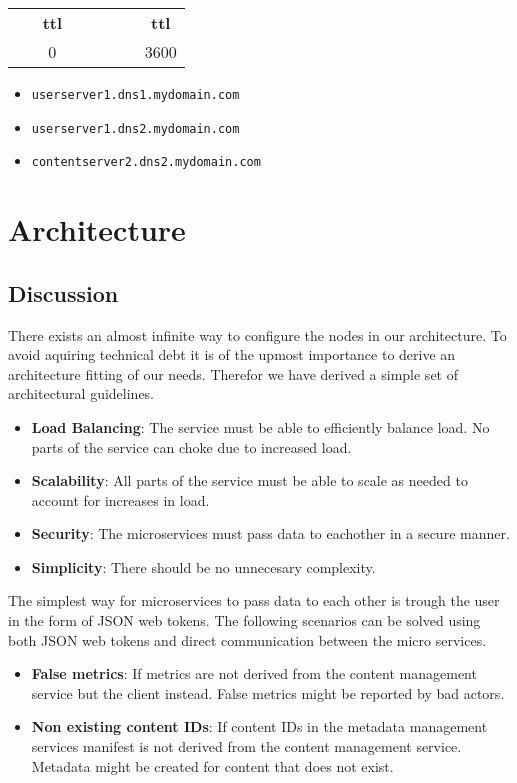 \documentclass[12pt]{article}
\begin{document}
\begin{tabular}{c c}
~ ~ \textbf{ttl} & ~ ~ ~ ~ ~ \textbf{ttl} \\
~ ~ 0 & ~ ~ ~ ~ ~ 3600 \\
\end{tabular}

    
\begin{itemize}
    \item \texttt{userserver1.dns1.mydomain.com}
    \item \texttt{userserver1.dns2.mydomain.com}
    \item \texttt{contentserver2.dns2.mydomain.com}
\end{itemize}


\section{Architecture}

\subsection{Discussion}
There exists an almost infinite way to configure the nodes in our architecture. 
To avoid aquiring technical debt it is
of the upmost importance to derive an architecture fitting of our needs.
Therefor we have derived a simple set of architectural guidelines.

\begin{itemize}
    \item \textbf{Load Balancing}: The service must be able to efficiently balance load. No parts of the service can choke due to increased load.
    \item \textbf{Scalability}: All parts of the service must be able to scale as needed to account for increases in load.
    \item \textbf{Security}: The microservices must pass data to eachother in a secure manner.
    \item \textbf{Simplicity}: There should be no unnecesary complexity.
\end{itemize}

The simplest way for microservices to pass data to each other is trough the user in the form of
JSON web tokens. The following scenarios can be solved using both JSON web tokens and direct communication between the micro services.

\begin{itemize}
    \item \textbf{False metrics}: If metrics are not derived from the content management service but the client instead. False metrics might be reported by bad actors.
    \item \textbf{Non existing content IDs}: If content IDs in the metadata management services manifest is not derived from the content management service. Metadata might be created for content that does not exist.
\end{itemize}
\end{document}
